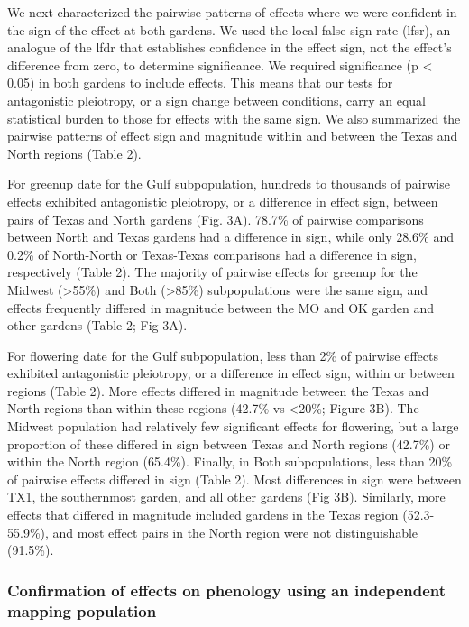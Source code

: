 \documentclass[
  9pt,
  twocolumn,
  twoside]{pnas-new}
\begin{document}
We next characterized the pairwise patterns of effects where we were
confident in the sign of the effect at both gardens. We used the local
false sign rate (lfsr), an analogue of the lfdr that establishes
confidence in the effect sign, not the effect's difference from zero, to
determine significance. We required significance (p \textless{} 0.05) in
both gardens to include effects. This means that our tests for
antagonistic pleiotropy, or a sign change between conditions, carry an
equal statistical burden to those for effects with the same sign. We
also summarized the pairwise patterns of effect sign and magnitude
within and between the Texas and North regions (Table 2).

For greenup date for the Gulf subpopulation, hundreds to thousands of
pairwise effects exhibited antagonistic pleiotropy, or a difference in
effect sign, between pairs of Texas and North gardens (Fig. 3A). 78.7\%
of pairwise comparisons between North and Texas gardens had a difference
in sign, while only 28.6\% and 0.2\% of North-North or Texas-Texas
comparisons had a difference in sign, respectively (Table 2). The
majority of pairwise effects for greenup for the Midwest
(\textgreater55\%) and Both (\textgreater85\%) subpopulations were the
same sign, and effects frequently differed in magnitude between the MO
and OK garden and other gardens (Table 2; Fig 3A).

For flowering date for the Gulf subpopulation, less than 2\% of pairwise
effects exhibited antagonistic pleiotropy, or a difference in effect
sign, within or between regions (Table 2). More effects differed in
magnitude between the Texas and North regions than within these regions
(42.7\% vs \textless20\%; Figure 3B). The Midwest population had
relatively few significant effects for flowering, but a large proportion
of these differed in sign between Texas and North regions (42.7\%) or
within the North region (65.4\%). Finally, in Both subpopulations, less
than 20\% of pairwise effects differed in sign (Table 2). Most
differences in sign were between TX1, the southernmost garden, and all
other gardens (Fig 3B). Similarly, more effects that differed in
magnitude included gardens in the Texas region (52.3-55.9\%), and most
effect pairs in the North region were not distinguishable (91.5\%).

\subsubsection{Confirmation of effects on phenology using an independent
mapping
population}\label{confirmation-of-effects-on-phenology-using-an-independent-mapping-population}
\end{document}
